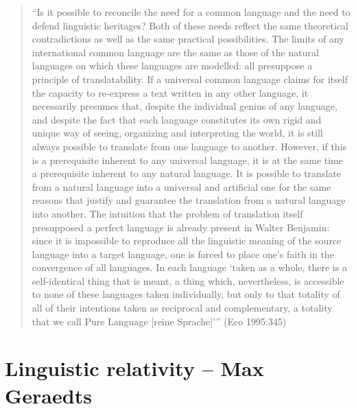 \begin{quote}
\begin{singlespace}
“Is it possible to reconcile the need for a common language and the need to defend linguistic heritages? Both of these needs reflect the same theoretical contradictions as well as the same practical possibilities. The limits of any international common language are the same as those of the natural languages on which these languages are modelled: all presuppose a principle of translatability. If a universal common language claims for itself the capacity to re-express a text written in any other language, it necessarily presumes that, despite the individual genius of any language, and despite the fact that each language constitutes its own rigid and unique way of seeing, organizing and interpreting the world, it is still always possible to translate from one language to another. However, if this is a prerequisite inherent to any universal language, it is at the same time a prerequisite inherent to any natural language. It is possible to translate from a natural language into a universal and artificial one for the same reasons that justify and guarantee the translation from a natural language into another. The intuition that the problem of translation itself presupposed a perfect language is already present in Walter Benjamin: since it is impossible to reproduce all the linguistic meaning of the source language into a target language, one is forced to place one’s faith in the convergence of all languages. In each language ‘taken as a whole, there is a self-identical thing that is meant, a thing which, nevertheless, is accessible to none of these languages taken individually, but only to that totality of all of their intentions taken as reciprocal and complementary, a totality that we call Pure Language [reine Sprache]’” (Eco 1995:345)
 \end{singlespace}
\end{quote}

\section{Linguistic relativity -- {\small Max Geraedts}}

